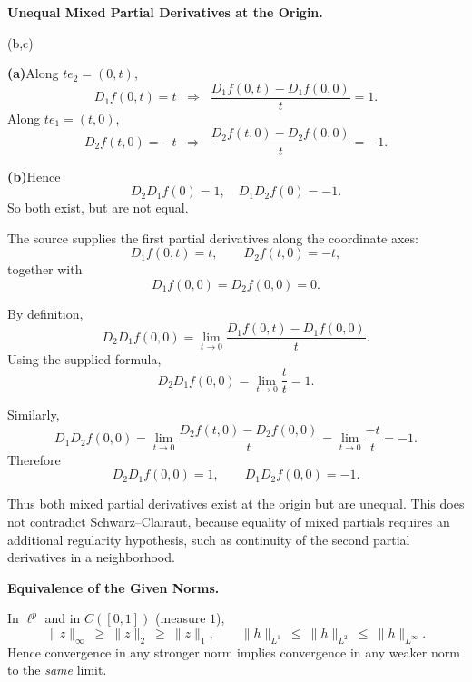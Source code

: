 \begin{problem}[CP-II-0272]
\label{prob:cp-ii-0272}
\textbf{Unequal Mixed Partial Derivatives at the Origin.}

\hspace*{1.5em}(b,c)

	\setcounter{enumi}{1}
	\par\smallskip\noindent\textbf{(a)}\quad Along $te_2=(0,t)$,
	\[
	D_1 f(0,t)=t \;\;\Rightarrow\;\;\frac{D_1 f(0,t)-D_1 f(0,0)}{t}=1.
	\]
	Along $te_1=(t,0)$,
	\[
	D_2 f(t,0)=-t \;\;\Rightarrow\;\;\frac{D_2 f(t,0)-D_2 f(0,0)}{t}=-1.
	\]

	\par\smallskip\noindent\textbf{(b)}\quad Hence
	\[
	D_2D_1 f(0)=1, \quad D_1D_2 f(0)=-1.
	\]
	So both exist, but are not equal.
\end{problem}

\begin{solution}
The source supplies the first partial derivatives along the coordinate axes:
\[
D_1f(0,t)=t,
\qquad
D_2f(t,0)=-t,
\]
together with
\[
D_1f(0,0)=D_2f(0,0)=0.
\]

By definition,
\[
D_2D_1f(0,0)
=
\lim_{t\to0}
\frac{D_1f(0,t)-D_1f(0,0)}{t}.
\]
Using the supplied formula,
\[
D_2D_1f(0,0)
=
\lim_{t\to0}\frac{t}{t}
=
1.
\]

Similarly,
\[
D_1D_2f(0,0)
=
\lim_{t\to0}
\frac{D_2f(t,0)-D_2f(0,0)}{t}
=
\lim_{t\to0}\frac{-t}{t}
=
-1.
\]
Therefore
\[
\boxed{
D_2D_1f(0,0)=1,
\qquad
D_1D_2f(0,0)=-1.
}
\]

Thus both mixed partial derivatives exist at the origin but are unequal. This does not
contradict Schwarz--Clairaut, because equality of mixed partials requires an additional
regularity hypothesis, such as continuity of the second partial derivatives in a
neighborhood.
\end{solution}


\begin{problem}[CP-II-0273]
\label{prob:cp-ii-0273}
\textbf{Equivalence of the Given Norms.}

\hspace*{1.5em}In $\ell^p$ and in $C([0,1])$ (measure $1$),
	\[
	\|z\|_\infty \ \ge\ \|z\|_2 \ \ge\ \|z\|_1,
	\qquad
	\|h\|_{L^1}\ \le\ \|h\|_{L^2}\ \le\ \|h\|_{L^\infty}.
	\]
	Hence convergence in any stronger norm implies convergence in any weaker norm to the \emph{same} limit.

\bigskip
\end{problem}

